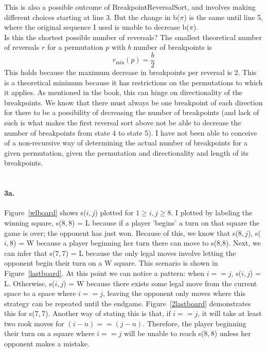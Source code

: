 \documentclass[12pt]{amsart}
\begin{document}
This is also a possible outcome of BreakpointReversalSort\(\), and involves making different choices starting at line 3.  But the change in b($\pi$) is the same until line 5, where the original sequence I used is unable to decrease b($\pi$).\\

Is this the shortest possible number of reversals?  The smallest theoretical number of reversals $r$ for a permutation $p$ with $b$ number of breakpoints is
\begin{displaymath}
  r_{\min}(p)=\frac{b}{2}
\end{displaymath}
This holds because the maximum decrease in breakpoints per reversal is 2.  This is a theoretical minimum because it has restrictions on the permutations to which it applies.  As mentioned in the book, this can hinge on directionality of the breakpoints.  We know that there must always be one breakpoint of each direction for there to be a possibility of decreasing the number of breakpoints (and lack of such is what makes the first reversal sort above not be able to decrease the number of breakpoints from state 4 to state 5).  I have not been able to conceive of a non-recursive way of determining the actual number of breakpoints for a given permutation, given the permutation and directionality and length of its breakpoints.


\afterpage{\clearpage}

\section{}
\paragraph{3a.} 
Figure~\ref{wlboard} shows s($i,j$) plotted for $1 \geq i,j \geq 8$.  I plotted by labeling the winning square, s($8,8$) = L because if a player 'begins' a turn on that square the game is over; the opponent has just won.  Because of this, we know that s($8,j$), s($i,8$) = W because a player beginning her turn there can move to s(8,8).  Next, we can infer that s($7,7$) = L because the only legal moves involve letting the opponent begin their turn on a W square.  This scenario is shown in Figure~\ref{lastboard}.  At this point we can notice a pattern: when $i == j$, s($i,j$) = L.  Otherwise, s($i,j$) = W because there exists some legal move from the current space to a space where $i == j$, leaving the opponent only moves where this strategy can be repeated until the endgame.  Figure~\ref{2lastboard} demonstrates this for s($7,7$).  Another way of stating this is that, if $i == j$, it will take at least two rook moves for $(i - n) == (j-n)$.  Therefore, the player beginning their turn on a square where $i == j$ will be unable to reach s($8,8$) unless her opponent makes a mistake. 
\end{document}
